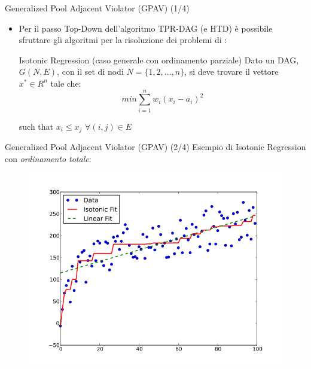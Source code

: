 \documentclass[9pt]{beamer}
\begin{document}
\begin{tframe}{Generalized Pool Adjacent Violator (GPAV) (1/4)}
\begin{itemize}
\item Per il passo Top-Down dell’algoritmo TPR-DAG (e HTD) è possibile sfruttare gli algoritmi per la risoluzione dei problemi di :
\begin{block}{Isotonic Regression (caso generale con ordinamento parziale)}
Dato un DAG, $G(N, E)$, con il set di nodi $N = \{1, 2, ..., n\}$, si deve trovare il vettore $x^{*}\in R^{n}$ tale che:
\[
min \sum_{i=1}^{n} w_i (x_i - a_i)^2
\]
\begin{center}
such that $x_i \le x_j$ $\forall (i,j) \in E $ 
\end{center}
\end{block} 

\end{itemize}
\end{tframe}
\begin{tframe}{Generalized Pool Adjacent Violator (GPAV) (2/4)}
Esempio di Isotonic Regression con \emph{ordinamento totale}:
\begin{figure}
\centering
\includegraphics[scale=0.3]{img/monotonic.png}
\end{figure}
\end{tframe}
\end{document}
